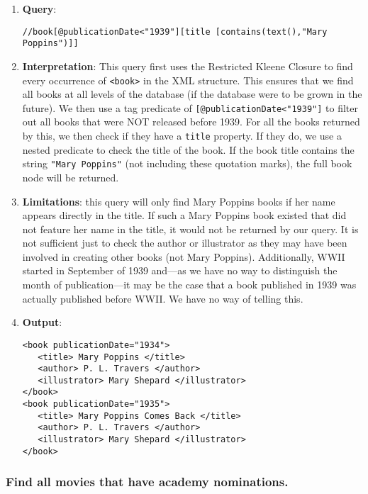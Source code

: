 \documentclass[11pt]{article}
\begin{document}
\begin{enumerate}
\item \textbf{Query}:
\begin{small}
\begin{verbatim}
//book[@publicationDate<"1939"][title [contains(text(),"Mary Poppins")]]
\end{verbatim}
\end{small}
\item \textbf{Interpretation}: This query first uses the Restricted Kleene Closure to find every occurrence of \texttt{<book>} in the XML structure. This ensures that we find all books at all levels of the database (if the database were to be grown in the future). We then use a tag predicate of \texttt{[@publicationDate<"1939"]} to filter out all books that were NOT released before 1939. For all the books returned by this, we then check if they have a \texttt{title} property. If they do, we use a nested predicate to check the title of the book. If the book title contains the string \texttt{"Mary Poppins"} (not including these quotation marks), the full book node will be returned.
\item \textbf{Limitations}: this query will only find Mary Poppins books if her name appears directly in the title. If such a Mary Poppins book existed that did not feature her name in the title, it would not be returned by our query. It is not sufficient just to check the author or illustrator as they may have been involved in creating other books (not Mary Poppins). Additionally, WWII started in September of 1939 and---as we have no way to distinguish the month of publication---it may be the case that a book published in 1939 was actually published before WWII. We have no way of telling this.
\item \textbf{Output}:
\begin{verbatim}
<book publicationDate="1934">
   <title> Mary Poppins </title>
   <author> P. L. Travers </author>
   <illustrator> Mary Shepard </illustrator>
</book>
<book publicationDate="1935">
   <title> Mary Poppins Comes Back </title>
   <author> P. L. Travers </author>
   <illustrator> Mary Shepard </illustrator>
</book>
\end{verbatim} 
\end{enumerate}


\subsubsection{Find all movies that have academy nominations.}
\end{document}
